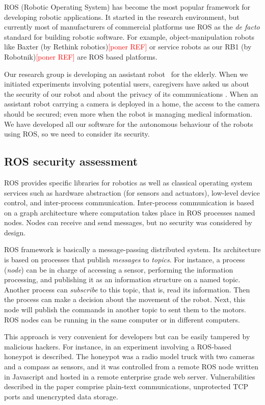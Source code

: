 \documentclass[journal,twoside]{JoPhA}
\begin{document}
ROS (Robotic Operating System) \cite{ROS09} has become the most popular framework for developing robotic applications. It started in the research environment, but currently most of manufacturers of commercial platforms use ROS as the {\em de facto} standard for building robotic software. For example, object-manipulation robots like Baxter (by Rethink robotics){\textcolor{red}{[poner REF]}} or service robots as our RB1 (by Robotnik){\textcolor{red}{[poner REF]}} are ROS based platforms.

Our research group is developing an assistant robot~\cite{Martin2014} for the elderly. When we initiated experiments involving potential users, caregivers have asked us about the security of our robot and about the privacy of its communications \cite{Denning2009}. When an assistant robot carrying a camera is deployed in a home, the access to the camera should be secured; even more when the robot is managing medical information. We have developed all our software for the autonomous behaviour of the robots using ROS, so we need to consider its security.


\subsection{ROS security assessment}

ROS provides specific libraries for robotics as well as classical operating system services such as hardware abstraction (for sensors and actuators), low-level device control, and inter-process communication. Inter-process communication is based on a graph architecture where computation takes place in ROS processes named nodes. Nodes can receive and send messages, but no security was considered by design. 

ROS framework is basically a message-passing distributed system. Its architecture is based on processes that publish {\em messages} to {\em topics}. For instance, a process ({\em node}) can be in charge of accessing a sensor, performing the information processing, and publishing it as an information structure on a named topic. Another process can {\em subscribe} to this topic, that is, read its information. Then the process can make a decision about the movement of the robot. Next, this node will publish the commands in another topic to sent them to the motors. ROS nodes can be running in the same computer or in different computers. 

This approach is very convenient for developers but can be easily tampered by malicious hackers. For instance, in \cite{McClean2013} an experiment involving a ROS-based honeypot is described. The honeypot was a radio model truck with two cameras and a compass as sensors, and it was controlled from a remote ROS node written in Javascript and hosted in a remote enterprise grade web server. Vulnerabilities described in the paper comprise plain-text communications, unprotected TCP ports and unencrypted data storage.
\end{document}
